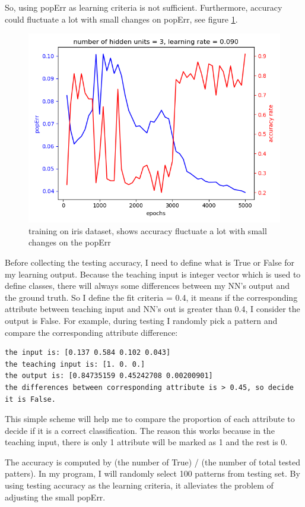 \documentclass[11pt]{article}
\begin{document}
So, using popErr as learning criteria is not sufficient. Furthermore, accuracy could fluctuate a lot with small changes on popErr, see figure \ref{fig-iris-fluctuate}.
\begin{figure}[htb]
\centering
\includegraphics[width=.9\linewidth]{./popErr_vs_accuracy_on_iris_accuracy_fluctuate_with_popErr.png}
\caption{training on iris dataset, shows accuracy fluctuate a lot with small changes on the popErr  \label{fig-iris-fluctuate}}
\end{figure}

Before collecting the testing accuracy, I need to define what is True or False for my learning output. Because the teaching input is integer vector which is used to define classes, there will always some differences between my NN's output and the ground truth. So I define the fit criteria = 0.4, it means if the corresponding attribute between teaching input and NN's out is greater than 0.4, I consider the output is False. For example, during testing I randomly pick a pattern and compare the corresponding attribute difference:
\begin{verbatim}
the input is: [0.137 0.584 0.102 0.043]
the teaching input is: [1. 0. 0.]
the output is: [0.84735159 0.45242708 0.00200901]
the differences between corresponding attribute is > 0.45, so decide it is False.
\end{verbatim}

This simple scheme will help me to compare the proportion of each attribute to decide if it is a correct classification. The reason this works because in the teaching input, there is only 1 attribute will be marked as 1 and the rest is 0.

The accuracy is computed by (the number of True) / (the number of total tested patters). In my program, I will randomly select 100 patterns from testing set. By using testing accuracy as the learning criteria, it alleviates the problem of adjusting the small popErr.
\end{document}
